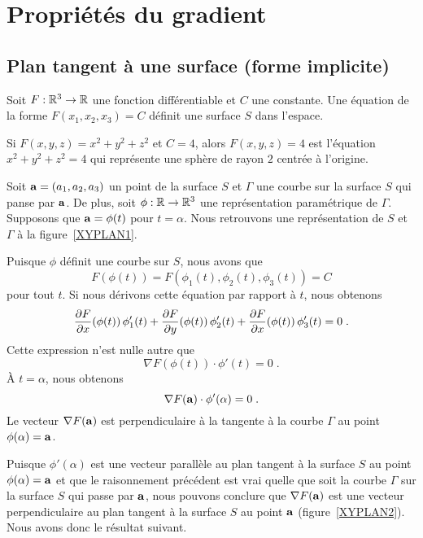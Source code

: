 {\section{Propriétés du gradient \eng}

\subsection{Plan tangent à une surface (forme implicite)}\label{planTangExpl}

Soit $F:\mathbb{R}^3 \rightarrow \mathbb{R}$ une fonction différentiable et $C$ une
constante.  Une équation de la forme $F(x_1,x_2,x_3)=C$ définit une
surface $S$ dans l'espace.

\begin{egg}
Si $F(x,y,z) = x^2 + y^2 + z^2$ et $C=4$, alors $F(x,y,z)=4$ est l'équation
$x^2+y^2+z^2=4$ qui représente une sphère de rayon $2$ centrée à l'origine.
\end{egg}

Soit $\mathbf{a} = (a_1,a_2,a_3)$ un point de la surface $S$ et $\Gamma$
une courbe sur la surface $S$ qui panse par $\mathbf{a}$.
De plus, soit $\phi:\mathbb{R} \rightarrow \mathbb{R}^3$ une
représentation paramétrique de $\Gamma$.  Supposons que $\mathbf{a} = \phi(t)$
pour $t=\alpha$.  Nous retrouvons une représentation de $S$ et $\Gamma$ à la
figure~\ref{XYPLAN1}.


Puisque $\phi$ définit une courbe sur $S$, nous avons que
\[
F(\phi(t)) = F(\phi_1(t), \phi_2(t), \phi_3(t)) = C
\]
pour tout $t$.  Si nous dérivons cette équation par rapport à $t$,
nous obtenons
\[
\frac{\partial F}{\partial x}(\phi(t))\,\phi_1'(t) + \frac{\partial F}{\partial y}(\phi(t))\,\phi_2'(t) +
\frac{\partial F}{\partial x}(\phi(t))\,\phi_3'(t) =0 \; .
\]
Cette expression n'est nulle autre que
\[
\nabla F(\phi(t))\cdot \phi'(t) = 0 \; .
\]
À $t=\alpha$, nous obtenons
\[
\nabla F(\mathbf{a})\cdot \phi'(\alpha) = 0 \; .
\]
Le vecteur $\nabla F(\mathbf{a})$ est perpendiculaire à la tangente à la courbe
$\Gamma$ au point $\phi(\alpha)= \mathbf{a}$.

Puisque $\phi'(\alpha)$ est une vecteur parallèle au plan tangent à la
surface $S$ au point $\phi(\alpha)= \mathbf{a}$ et que le raisonnement précédent
est vrai quelle que soit la courbe $\Gamma$ sur la surface $S$ qui passe par
$\mathbf{a}$, nous pouvons conclure que $\nabla F(\mathbf{a})$ est une vecteur
perpendiculaire au plan tangent à la surface $S$ au point $\mathbf{a}$
(figure~\ref{XYPLAN2}).  Nous avons donc le résultat suivant.

}
